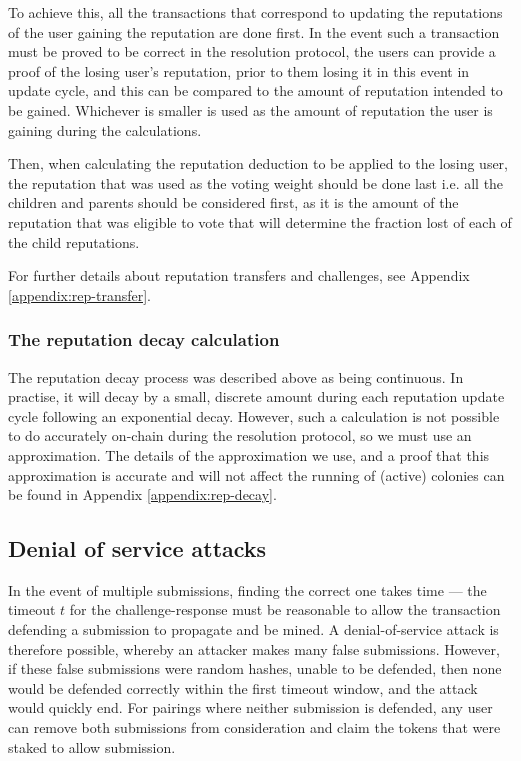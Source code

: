 To achieve this, all the transactions that correspond to updating the reputations of the user gaining the reputation are done first. In the event such a transaction must be proved to be correct in the resolution protocol, the users can provide a proof of the losing user's reputation, prior to them losing it in this event in update cycle, and this can be compared to the amount of reputation intended to be gained. Whichever is smaller is used as the amount of reputation the user is gaining during the calculations.

Then, when calculating the reputation deduction to be applied to the losing user, the reputation that was used as the voting weight should be done last i.e. all the children and parents should be considered first, as it is the amount of the reputation that was eligible to vote that will determine the fraction lost of each of the child reputations. %

For further details about reputation transfers and challenges, see Appendix \ref{appendix:rep-transfer}.

\subsubsection{The reputation decay calculation}\label{sec:repdecay}
The reputation decay process was described above as being continuous. In practise, it will decay by a small, discrete amount during each reputation update cycle following an exponential decay. However, such a calculation is not possible to do accurately on-chain during the resolution protocol, so we must use an approximation. The details of the approximation we use, and a proof that this approximation is accurate and will not affect the running of (active) colonies can be found in Appendix \ref{appendix:rep-decay}.

\subsection{Denial of service attacks}\label{sec:mining-possible-attacks}

In the event of multiple submissions, finding the correct one takes time --- the timeout $t$ for the challenge-response must be reasonable to allow the transaction defending a submission to propagate and be mined. A denial-of-service attack is therefore possible, whereby an attacker makes many false submissions. However, if these false submissions were random hashes, unable to be defended, then none would be defended correctly within the first timeout window, and the attack would quickly end. For pairings where neither submission is defended, any user can remove both submissions from consideration and claim the tokens that were staked to allow submission.

